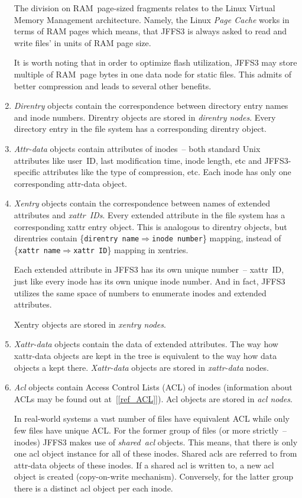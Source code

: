 \begin{enumerate}
The division on \mbox{RAM~page-sized} fragments relates to the Linux Virtual
Memory Management architecture. Namely, the Linux \emph{Page Cache} works in
terms of RAM pages which means, that JFFS3 is always asked to read and write
files' in units of RAM page size.

It is worth noting that in order to optimize flash utilization, JFFS3 may store
multiple of \mbox{RAM page} bytes in one data node for static files. This
admits of better compression and leads to several other benefits.

\item \emph{Direntry} objects contain the correspondence between directory
entry names and inode numbers. Direntry objects are stored in \emph{direntry
nodes}. Every directory entry in the file system has a corresponding direntry
object.

\item \emph{Attr-data} objects contain attributes of inodes~-- both standard
Unix attributes like user~ID, last modification time, inode
length, etc and \mbox{JFFS3-specific} attributes like the type of compression,
etc. Each inode has only one corresponding \mbox{attr-data} object.

\item \emph{Xentry} objects contain the correspondence between names of
extended attributes and \emph{xattr~IDs}. Every extended attribute in the file
system has a corresponding xattr entry object. This is analogous to direntry
objects, but direntries contain
\{\texttt{direntry~name}$\Rightarrow$\texttt{inode~number}\} mapping, instead
of \{\texttt{xattr~name}$\Rightarrow$\texttt{xattr~ID}\} mapping in xentries.

Each extended attribute in JFFS3 has its own unique number~-- xattr~ID, just
like every inode has its own unique inode number. And in fact, JFFS3 utilizes
the same space of numbers to enumerate inodes and extended attributes. 

Xentry objects are stored in \emph{xentry nodes}.

\item \emph{Xattr-data} objects contain the data of extended attributes. The
way how \mbox{xattr-data} objects are kept in the tree is equivalent to the way
how data objects a kept there. \emph{Xattr-data} objects are stored in
\emph{xattr-data} nodes.

\item \emph{Acl} objects contain Access Control Lists (ACL) of inodes
(information about ACLs may be found out at~[\ref{ref_ACL}]). Acl objects are
stored in \emph{acl nodes}.

In \mbox{real-world} systems a vast number of files have equivalent ACL while
only few files have unique ACL. For the former group of files (or more
strictly~-- inodes) JFFS3 makes use of \emph{shared~acl} objects. This means,
that there is only one acl object instance for all of these inodes. Shared acls
are referred to from \mbox{attr-data} objects of these inodes. If a shared acl
is written to, a new acl object is created (\mbox{copy-on-write} mechanism).
Conversely, for the latter group there is a distinct acl object per each inode.

\end{enumerate}

